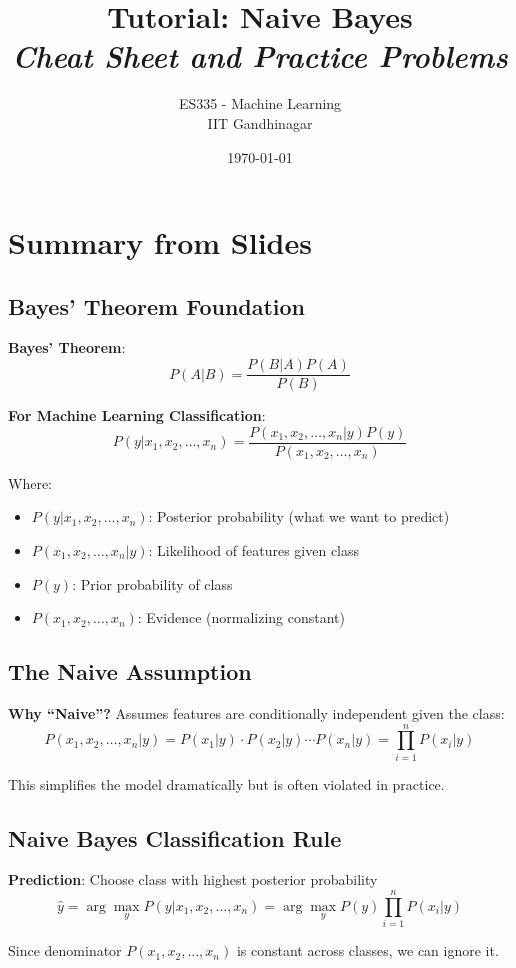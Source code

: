 \documentclass{article}
\title{\textbf{Tutorial: Naive Bayes} \\ \textit{Cheat Sheet and Practice Problems}}
\author{ES335 - Machine Learning \\ IIT Gandhinagar}
\date{\today}
\begin{document}
\maketitle

\section{Summary from Slides}

\subsection{Bayes' Theorem Foundation}

\textbf{Bayes' Theorem}:
$$P(A|B) = \frac{P(B|A)P(A)}{P(B)}$$

\textbf{For Machine Learning Classification}:
$$P(y|x_1, x_2, \ldots, x_n) = \frac{P(x_1, x_2, \ldots, x_n|y)P(y)}{P(x_1, x_2, \ldots, x_n)}$$

Where:
\begin{itemize}
    \item $P(y|x_1, x_2, \ldots, x_n)$: Posterior probability (what we want to predict)
    \item $P(x_1, x_2, \ldots, x_n|y)$: Likelihood of features given class
    \item $P(y)$: Prior probability of class
    \item $P(x_1, x_2, \ldots, x_n)$: Evidence (normalizing constant)
\end{itemize}

\subsection{The Naive Assumption}

\textbf{Why ``Naive''?} Assumes features are conditionally independent given the class:
$$P(x_1, x_2, \ldots, x_n|y) = P(x_1|y) \cdot P(x_2|y) \cdots P(x_n|y) = \prod_{i=1}^{n} P(x_i|y)$$

This simplifies the model dramatically but is often violated in practice.

\subsection{Naive Bayes Classification Rule}

\textbf{Prediction}: Choose class with highest posterior probability
$$\hat{y} = \arg\max_{y} P(y|x_1, x_2, \ldots, x_n) = \arg\max_{y} P(y)\prod_{i=1}^{n} P(x_i|y)$$

Since denominator $P(x_1, x_2, \ldots, x_n)$ is constant across classes, we can ignore it.
\end{document}
